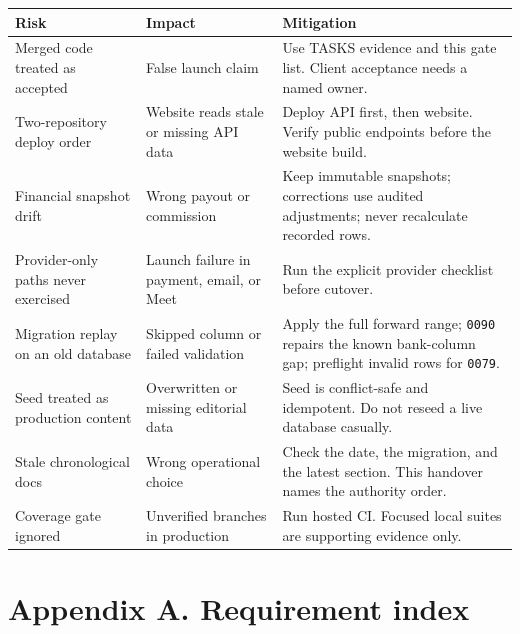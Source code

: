 \documentclass[11pt,a4paper]{article}
\newcommand{\code}[1]{\texttt{#1}}
\begin{document}
\begin{tabular}{@{}L{4.2cm}L{5.0cm}L{5.8cm}@{}}
\toprule
\textbf{Risk} & \textbf{Impact} & \textbf{Mitigation} \\
\midrule
Merged code treated as accepted & False launch claim & Use TASKS evidence and this gate list. Client acceptance needs a named owner. \\
Two-repository deploy order & Website reads stale or missing API data & Deploy API first, then website. Verify public endpoints before the website build. \\
Financial snapshot drift & Wrong payout or commission & Keep immutable snapshots; corrections use audited adjustments; never recalculate recorded rows. \\
Provider-only paths never exercised & Launch failure in payment, email, or Meet & Run the explicit provider checklist before cutover. \\
Migration replay on an old database & Skipped column or failed validation & Apply the full forward range; \code{0090} repairs the known bank-column gap; preflight invalid rows for \code{0079}. \\
Seed treated as production content & Overwritten or missing editorial data & Seed is conflict-safe and idempotent. Do not reseed a live database casually. \\
Stale chronological docs & Wrong operational choice & Check the date, the migration, and the latest section. This handover names the authority order. \\
Coverage gate ignored & Unverified branches in production & Run hosted CI. Focused local suites are supporting evidence only. \\
\bottomrule
\end{tabular}

\section{Appendix A. Requirement index}
\end{document}
